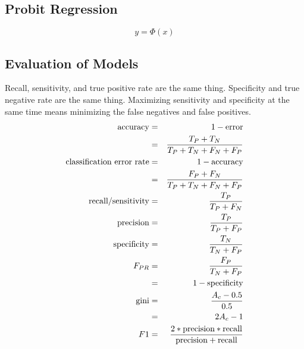 	\subsection{Probit Regression}
	\begin{equation}
		y = \Phi\left(x\right)
	\end{equation}
	\begin{mathwhere}[0.49in]
	\end{mathwhere}


	\subsection{Evaluation of Models}
Recall, sensitivity, and true positive rate are the same thing.  Specificity and true negative rate are the same thing.  Maximizing sensitivity and specificity at the same time means minimizing the false negatives and false positives.
	\begin{eqnarray}
		\textrm{accuracy} 						& = & 1 - \textrm{error} 						\\
												& = & \frac{T_P + T_N}{T_P + T_N + F_N + F_P} 	\\
		\textrm{classification error  rate}		& = & 1 - \textrm{accuracy} 					\\
												& = & \frac{F_P + F_N}{T_P + T_N + F_N + F_P} 	\\
		\textrm{recall/sensitivity}				& = & \frac{T_P}{T_P + F_N} 					\\
		\textrm{precision} 						& = & \frac{T_P}{T_P + F_P} 					\\
		\textrm{specificity} 					& = & \frac{T_N}{T_N + F_P}						\\
		\mbox{$F_{PR}$}						& = & \frac{F_P}{T_N + F_P}						\\
												& = & 1 - \textrm{specificity}					\\
		\textrm{gini}							& = & \frac{A_c - 0.5}{0.5}						\\
												& = & 2A_c - 1									\\
		F1										& = & \frac{2*\textrm{precision} * \textrm{recall}}
                                                             {\textrm{precision} + \textrm{recall}}
	\end{eqnarray}
	\begin{mathwhere}[0.4in]
	\end{mathwhere}

